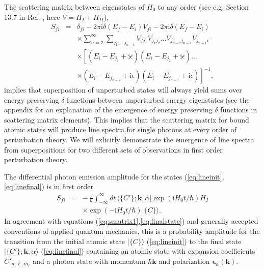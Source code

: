 \documentclass[final,3p,times,twocolumn]{elsarticle3}
\begin{document}
The scattering matrix between eigenstates of $H_0$ to any order
(see e.g. Section 13.7 in Ref. \cite{rdqm}, here $V=H_I+H_{II}$),
\begin{eqnarray}\nonumber
S_{\!fi}&=&\delta_{fi}-2\pi\mathrm{i}\delta(E_f-E_i)V_{fi}
-2\pi\mathrm{i}\delta(E_f-E_i)
\\ \nonumber
&&\times\sum_{n=2}^\infty\sum_{j_1,\ldots j_{n-1}}
V_{fj_1}V_{j_1 j_2}\ldots V_{j_{n-2}j_{n-1}}V_{j_{n-1}i}
\\ \nonumber
&&\times
\left[(E_i-E_{j_1}+\mathrm{i}\epsilon)(E_i-E_{j_2}+\mathrm{i}\epsilon)\ldots
\right. 
\\ \label{eq:Snthorder}
&&\times\left.
(E_i-E_{j_{n-2}}+\mathrm{i}\epsilon)(E_i-E_{j_{n-1}}+\mathrm{i}\epsilon)\right]^{-1},
\end{eqnarray}
implies that superposition of unperturbed states will always yield sums over energy 
preserving $\delta$ functions between unperturbed energy eigenstates (see the 
appendix for an explanation of the emergence of energy preserving $\delta$ functions
in scattering matrix elements). This implies 
that the scattering matrix for bound atomic states will produce line spectra for 
single photons at every order of perturbation theory. We will exlicitly demonstrate 
the emergence of line spectra from superpositions for two different sets of 
observations in first order perturbation theory.

The differential photon emission amplitude for the 
states (\ref{eq:lineinit},\ref{eq:linefinal}) is in first order 
\begin{eqnarray}\nonumber
S_{\!fi}&=&-\,\frac{\mathrm{i}}{\hbar}\int_{-\infty}^\infty\!dt\,\bm{\langle}
\{C'\};\bm{k},\alpha\bm{|}\exp(\mathrm{i}H_0t/\hbar)
H_I
\\ \label{eq:line1}
&&\times\exp(-\mathrm{i}H_0t/\hbar)\bm{|}\{C\}\bm{\rangle}.
\end{eqnarray}
In agreement with equations (\ref{eq:smatrix1},\ref{eq:finalstate})
and generally accepted conventions of applied quantum mechanics,
this is a probability amplitude for the transition from the initial
atomic state $\bm{|}\{C\}\bm{\rangle}$ (\ref{eq:lineinit}) to the final 
state $\bm{|}\{C'\};\bm{k},\alpha\bm{\rangle}$ (\ref{eq:linefinal})
containing an atomic state with expansion coefficients $C'_{n,\ell,m_\ell}$ 
and a photon state with momentum $\hbar\bm{k}$ and 
polarization $\bm{\epsilon}_\alpha(\bm{k})$. 
\end{document}
